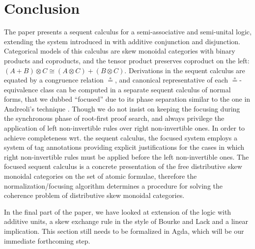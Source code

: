 \documentclass[submission,copyright,creativecommons]{eptcs}
\theoremstyle{definition}
\newcommand{\ot}{\otimes}
\newcommand\niccolo[1]{\mbox{}
{\marginpar{\color{red}NV}}
{\sf\noindent\color{red}#1}}%
\begin{document}

\section{Conclusion}
The paper presents a sequent calculus for a semi-associative and semi-unital logic,  extending the system introduced in \cite{uustalu:sequent:2021} with additive conjunction and disjunction. Categorical models of this calculus are skew monoidal categories with binary products and coproducts, and the tensor product preserves coproduct on the left: $(A + B) \ot C \cong (A \ot C) + (B \ot C)$.
Derivations in the sequent calculus are equated by a congruence relation $\circeq$, and canonical representative of each $\circeq$-equivalence class can be computed in a separate sequent calculus of normal forms, that we dubbed ``focused'' due to its phase separation similar to the one in Andreoli's technique \cite{andreoli:logic:1992}.  Though we do not insist on keeping the focusing during the synchronous phase of root-first proof search, and always privilege the application of left non-invertible rules over right non-invertible ones. In order to achieve completeness wrt. the sequent calculus, the focused system employs a system of tag annotations providing explicit justifications for the cases in which right non-invertible rules must be applied before the left non-invertible ones.
The focused sequent calculus is a concrete presentation of the free distributive skew monoidal categories on the set of atomic formulae, therefore the normalization/focusing algorithm determines a procedure for solving the coherence problem of distributive skew monoidal categories.

In the final part of the paper, we have looked at extension of the logic with additive units, a skew exchange rule in the style of Bourke and Lack \cite{bourke:lack:braided:2020} and a linear implication. This section still needs to be formalized in Agda, which will be our immediate forthcoming step.
\end{document}
